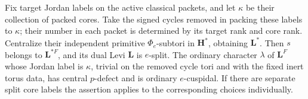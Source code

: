 \begin{lemma}\label{lab:packed-pair}
Fix target Jordan labels on the active classical packets,
and let $\kappa$ be their collection of packed cores.
Take the signed cycles removed in packing these labels
to $\kappa$; their number in each packet is determined by
its target rank and core rank.  Centralize their independent
primitive $\Phi_e$-subtori in $\mathbf H^*$, obtaining
$\mathbf L^*$.  Then $s$ belongs
to $\mathbf L^{*F}$, and its dual Levi $\mathbf L$ is
$e$-split.  The ordinary character $\lambda$ of
$\mathbf L^F$ whose Jordan label is $\kappa$, trivial on
the removed cycle tori and with the fixed inert torus data,
has central $p$-defect and is ordinary $e$-cuspidal.
If there are separate split core labels the assertion applies
to the corresponding choices individually.
\end{lemma}

